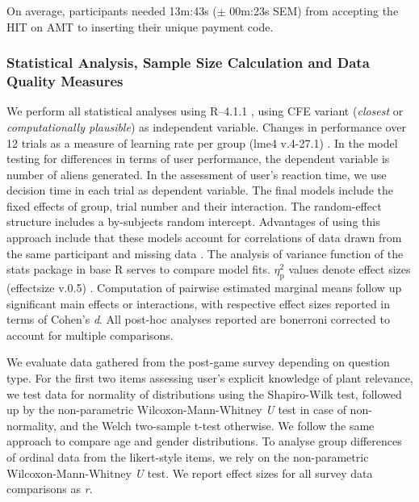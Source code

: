 On average, participants needed 13m:43s ($\pm$ 00m:23s SEM) from accepting the HIT on AMT to inserting their unique payment code.

\subsubsection{Statistical Analysis, Sample Size Calculation and Data Quality Measures}

We perform all statistical analyses using R–4.1.1 \citep{r_core_team_r_2021}, using \gls{CFE} variant (\textit{closest} or \textit{computationally plausible}) as independent variable.
Changes in performance over 12 trials as a measure of learning rate per group (lme4 v.4-27.1) \citep{bates_fitting_2015}.
In the model testing for differences in terms of user performance, the dependent variable is number of aliens generated. 
In the assessment of user's reaction time, we use decision time in each trial as dependent variable.
The final models include the fixed effects of group, trial number and their interaction. The random-effect structure includes a by-subjects random intercept. 
Advantages of using this approach include that these models account for correlations of data drawn from the same participant and missing data \citep{detry_analyzing_2016,muth_alternative_2016}.
The analysis of variance function of the stats package in base R serves to compare model fits.
$\eta_{\text{p}}^{2}$ values denote effect sizes (effectsize v.0.5) \citep{ben-shachar_effectsize_2020}.
Computation of pairwise estimated marginal means follow up significant main effects or interactions, with respective effect sizes reported in terms of Cohen’s \textit{d}.
All post-hoc analyses reported are bonerroni corrected to account for multiple comparisons.

We evaluate data gathered from the post-game survey depending on question type.
For the first two items assessing user's explicit knowledge of plant relevance, we test data for normality of distributions using the Shapiro-Wilk test, followed up by the non-parametric Wilcoxon-Mann-Whitney \textit{U} test in case of non-normality, and the Welch two-sample t-test otherwise. 
We follow the same approach to compare age and gender distributions.
To analyse group differences of ordinal data from the likert-style items, we rely on the non-parametric Wilcoxon-Mann-Whitney \textit{U} test.
We report effect sizes for all survey data comparisons as \textit{r}.

